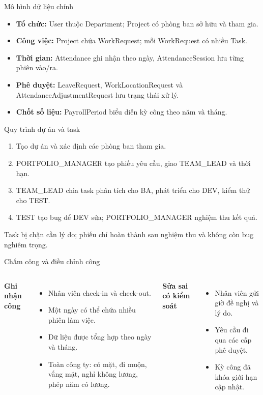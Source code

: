 \documentclass[aspectratio=169,11pt]{beamer}
\begin{document}
\begin{frame}{Mô hình dữ liệu chính}
\begin{itemize}
\setlength{\itemsep}{8pt}
\item \textbf{Tổ chức:} User thuộc Department; Project có phòng ban sở hữu và tham gia.
\item \textbf{Công việc:} Project chứa WorkRequest; mỗi WorkRequest có nhiều Task.
\item \textbf{Thời gian:} Attendance ghi nhận theo ngày, AttendanceSession lưu từng phiên vào/ra.
\item \textbf{Phê duyệt:} LeaveRequest, WorkLocationRequest và AttendanceAdjustmentRequest lưu trạng thái xử lý.
\item \textbf{Chốt số liệu:} PayrollPeriod biểu diễn kỳ công theo năm và tháng.
\end{itemize}
\end{frame}

\begin{frame}{Quy trình dự án và task}
\begin{enumerate}
\setlength{\itemsep}{10pt}
\item Tạo dự án và xác định các phòng ban tham gia.
\item PORTFOLIO\_MANAGER tạo phiếu yêu cầu, giao TEAM\_LEAD và thời hạn.
\item TEAM\_LEAD chia task phân tích cho BA, phát triển cho DEV, kiểm thử cho TEST.
\item TEST tạo bug để DEV sửa; PORTFOLIO\_MANAGER nghiệm thu kết quả.
\end{enumerate}
\vspace{5mm}
\small Task bị chặn cần lý do; phiếu chỉ hoàn thành sau nghiệm thu và không còn bug nghiêm trọng.
\end{frame}

\begin{frame}{Chấm công và điều chỉnh công}
\begin{columns}[T,onlytextwidth]
\textbf{Ghi nhận công}
\begin{itemize}
\item Nhân viên check-in và check-out.
\item Một ngày có thể chứa nhiều phiên làm việc.
\item Dữ liệu được tổng hợp theo ngày và tháng.
\item Toàn công ty: có mặt, đi muộn, vắng mặt, nghỉ không lương, phép năm có lương.
\end{itemize}
\textbf{Sửa sai có kiểm soát}
\begin{itemize}
\item Nhân viên gửi giờ đề nghị và lý do.
\item Yêu cầu đi qua các cấp phê duyệt.
\item Kỳ công đã khóa giới hạn cập nhật.
\end{itemize}
\end{columns}
\end{frame}
\end{document}
